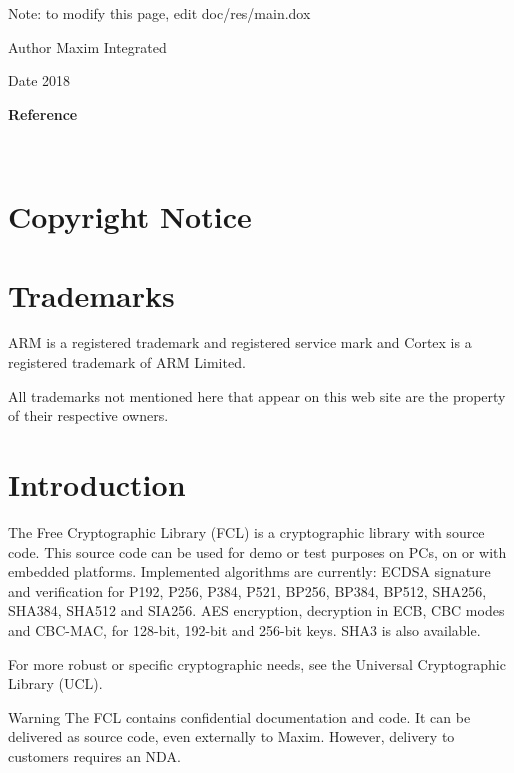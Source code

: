 Note\+: to modify this page, edit doc/res/main.\+dox

\begin{DoxyAuthor}{Author}
Maxim Integrated
\end{DoxyAuthor}
\begin{DoxyDate}{Date}
2018
\end{DoxyDate}
{\bfseries Reference}

~~~~~~~~\hypertarget{index_s2}{}\section{Copyright Notice}\label{index_s2}

\begin{DoxyCode}
\end{DoxyCode}
 \hypertarget{index_trademarks}{}\section{Trademarks}\label{index_trademarks}

\begin{DoxyItemize}
\item A\+RM is a registered trademark and registered service mark and Cortex is a registered trademark of A\+RM Limited.
\item All trademarks not mentioned here that appear on this web site are the property of their respective owners.
\end{DoxyItemize}\hypertarget{index_Introduction}{}\section{Introduction}\label{index_Introduction}
The Free Cryptographic Library (F\+CL) is a cryptographic library with source code. This source code can be used for demo or test purposes on P\+Cs, on or with embedded platforms. Implemented algorithms are currently\+: E\+C\+D\+SA signature and verification for P192, P256, P384, P521, B\+P256, B\+P384, B\+P512, S\+H\+A256, S\+H\+A384, S\+H\+A512 and S\+I\+A256. A\+ES encryption, decryption in E\+CB, C\+BC modes and C\+B\+C-\/\+M\+AC, for 128-\/bit, 192-\/bit and 256-\/bit keys. S\+H\+A3 is also available.

For more robust or specific cryptographic needs, see the Universal Cryptographic Library (U\+CL).

\begin{DoxyWarning}{Warning}
The F\+CL contains confidential documentation and code. It can be delivered as source code, even externally to Maxim. However, delivery to customers requires an N\+DA.
\end{DoxyWarning}

